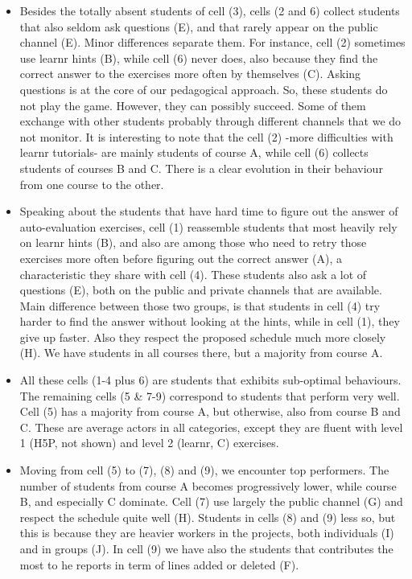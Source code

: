 \documentclass[
]{article}
\begin{document}
\begin{itemize}
\item
  Besides the totally absent students of cell (3), cells (2 and 6)
  collect students that also seldom ask questions (E), and that rarely
  appear on the public channel (E). Minor differences separate them. For
  instance, cell (2) sometimes use learnr hints (B), while cell (6)
  never does, also because they find the correct answer to the exercises
  more often by themselves (C). Asking questions is at the core of our
  pedagogical approach. So, these students do not play the game.
  However, they can possibly succeed. Some of them exchange with other
  students probably through different channels that we do not monitor.
  It is interesting to note that the cell (2) -more difficulties with
  learnr tutorials- are mainly students of course A, while cell (6)
  collects students of courses B and C. There is a clear evolution in
  their behaviour from one course to the other.
\item
  Speaking about the students that have hard time to figure out the
  answer of auto-evaluation exercises, cell (1) reassemble students that
  most heavily rely on learnr hints (B), and also are among those who
  need to retry those exercises more often before figuring out the
  correct answer (A), a characteristic they share with cell (4). These
  students also ask a lot of questions (E), both on the public and
  private channels that are available. Main difference between those two
  groups, is that students in cell (4) try harder to find the answer
  without looking at the hints, while in cell (1), they give up faster.
  Also they respect the proposed schedule much more closely (H). We have
  students in all courses there, but a majority from course A.
\item
  All these cells (1-4 plus 6) are students that exhibits sub-optimal
  behaviours. The remaining cells (5 \& 7-9) correspond to students that
  perform very well. Cell (5) has a majority from course A, but
  otherwise, also from course B and C. These are average actors in all
  categories, except they are fluent with level 1 (H5P, not shown) and
  level 2 (learnr, C) exercises.
\item
  Moving from cell (5) to (7), (8) and (9), we encounter top performers.
  The number of students from course A becomes progressively lower,
  while course B, and especially C dominate. Cell (7) use largely the
  public channel (G) and respect the schedule quite well (H). Students
  in cells (8) and (9) less so, but this is because they are heavier
  workers in the projects, both individuals (I) and in groups (J). In
  cell (9) we have also the students that contributes the most to he
  reports in term of lines added or deleted (F).
\end{itemize}
\end{document}
